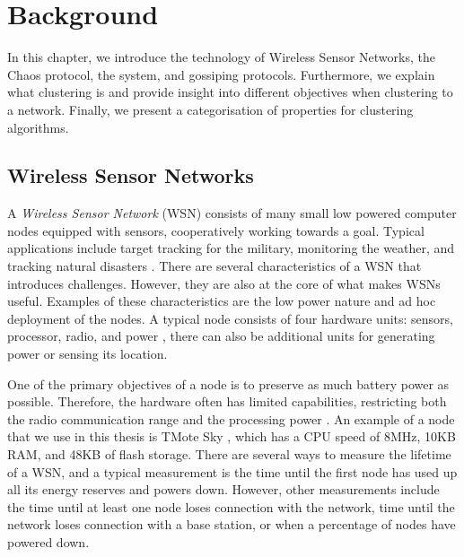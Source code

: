 \chapter{Background}

\label{chap:background}
In this chapter, we introduce the technology of Wireless Sensor Networks, the Chaos protocol, the \atwo{} system, and gossiping protocols. Furthermore, we explain what clustering is and provide insight into different objectives when clustering to a network. Finally, we present a categorisation of properties for clustering algorithms.


\section{Wireless Sensor Networks}
A \emph{Wireless Sensor Network} (WSN) consists of many small low powered computer nodes equipped with sensors, cooperatively working towards a goal. Typical applications include target tracking for the military, monitoring the weather, and tracking natural disasters \cite{Yick2008-wsn-survey}. There are several characteristics of a WSN that introduces challenges. However, they are also at the core of what makes WSNs useful. Examples of these characteristics are the low power nature and ad hoc deployment of the nodes. A typical node consists of four hardware units: sensors, processor, radio, and power \cite{Akyildiz2002-wsn-survey}, there can also be additional units for generating power or sensing its location. 

One of the primary objectives of a node is to preserve as much battery power as possible. Therefore, the hardware often has limited capabilities, restricting both the radio communication range and the processing power \cite{NikolaosA.Pantaziz2007-wsn-power-survey}. An example of a node that we use in this thesis is TMote Sky \cite{tmotesky-datasheet}, which has a CPU speed of 8MHz, 10KB RAM, and 48KB of flash storage. There are several ways to measure the lifetime of a WSN, and a typical measurement is the time until the first node has used up all its energy reserves and powers down. However, other measurements include the time until at least one node loses connection with the network, time until the network loses connection with a base station, or when a percentage of nodes have powered down.


